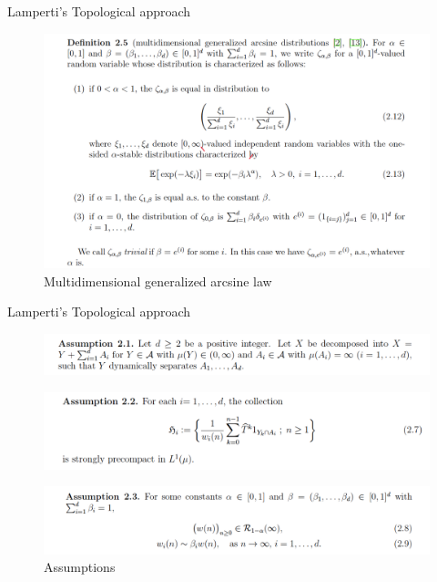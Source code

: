 \documentclass{beamer}
\begin{document}
\begin{frame}{Lamperti's Topological approach}
    	\begin{figure}[H]
	\centering
  	\includegraphics[width=\linewidth]{multi1.png}
  	\caption{Multidimensional generalized arcsine law}
  	\label{multi-def}
	\end{figure}
\end{frame}


\begin{frame}{Lamperti's Topological approach}
    	\begin{figure}[H]
	\centering
  	\includegraphics[width=\linewidth]{assum1.png}
  	\label{multi-assum1}
	\end{figure}
	\begin{figure}[H]
	\centering
  	\includegraphics[width=\linewidth]{assum2.png}
  	\label{multi-assum2}
	\end{figure}
	\begin{figure}[H]
	\centering
  	\includegraphics[width=\linewidth]{assum3.png}
  	\caption{Assumptions}
  	\label{multi-assum3}
	\end{figure}
\end{frame}
\end{document}
